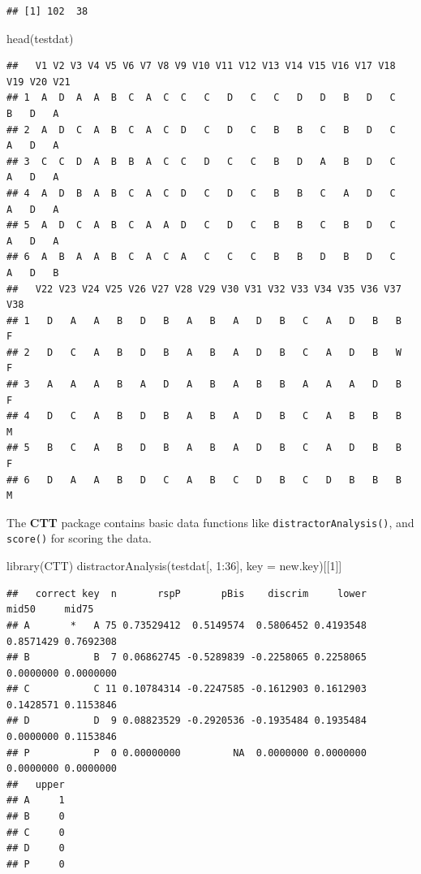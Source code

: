\documentclass[
]{book}
\newenvironment{Shaded}{\begin{snugshade}}{\end{snugshade}}
\newcommand{\AttributeTok}[1]{\textcolor[rgb]{0.77,0.63,0.00}{#1}}
\newcommand{\DecValTok}[1]{\textcolor[rgb]{0.00,0.00,0.81}{#1}}
\newcommand{\FunctionTok}[1]{\textcolor[rgb]{0.00,0.00,0.00}{#1}}
\newcommand{\NormalTok}[1]{#1}
\newcommand{\SpecialCharTok}[1]{\textcolor[rgb]{0.00,0.00,0.00}{#1}}
\begin{document}
\begin{verbatim}
## [1] 102  38
\end{verbatim}

\begin{Shaded}
\begin{Highlighting}[]
\FunctionTok{head}\NormalTok{(testdat)}
\end{Highlighting}
\end{Shaded}

\begin{verbatim}
##   V1 V2 V3 V4 V5 V6 V7 V8 V9 V10 V11 V12 V13 V14 V15 V16 V17 V18 V19 V20 V21
## 1  A  D  A  A  B  C  A  C  C   C   D   C   C   D   D   B   D   C   B   D   A
## 2  A  D  C  A  B  C  A  C  D   C   D   C   B   B   C   B   D   C   A   D   A
## 3  C  C  D  A  B  B  A  C  C   D   C   C   B   D   A   B   D   C   A   D   A
## 4  A  D  B  A  B  C  A  C  D   C   D   C   B   B   C   A   D   C   A   D   A
## 5  A  D  C  A  B  C  A  A  D   C   D   C   B   B   C   B   D   C   A   D   A
## 6  A  B  A  A  B  C  A  C  A   C   C   C   B   B   D   B   D   C   A   D   B
##   V22 V23 V24 V25 V26 V27 V28 V29 V30 V31 V32 V33 V34 V35 V36 V37 V38
## 1   D   A   A   B   D   B   A   B   A   D   B   C   A   D   B   B   F
## 2   D   C   A   B   D   B   A   B   A   D   B   C   A   D   B   W   F
## 3   A   A   A   B   A   D   A   B   A   B   B   A   A   A   D   B   F
## 4   D   C   A   B   D   B   A   B   A   D   B   C   A   B   B   B   M
## 5   B   C   A   B   D   B   A   B   A   D   B   C   A   D   B   B   F
## 6   D   A   A   B   D   C   A   B   C   D   B   C   D   B   B   B   M
\end{verbatim}

The \textbf{CTT} package contains basic data functions like \texttt{distractorAnalysis()}, and \texttt{score()} for scoring the data.

\begin{Shaded}
\begin{Highlighting}[]
\FunctionTok{library}\NormalTok{(CTT)}
\FunctionTok{distractorAnalysis}\NormalTok{(testdat[, }\DecValTok{1}\SpecialCharTok{:}\DecValTok{36}\NormalTok{], }\AttributeTok{key =}\NormalTok{ new.key)[[}\DecValTok{1}\NormalTok{]]}
\end{Highlighting}
\end{Shaded}

\begin{verbatim}
##   correct key  n       rspP       pBis    discrim     lower     mid50     mid75
## A       *   A 75 0.73529412  0.5149574  0.5806452 0.4193548 0.8571429 0.7692308
## B           B  7 0.06862745 -0.5289839 -0.2258065 0.2258065 0.0000000 0.0000000
## C           C 11 0.10784314 -0.2247585 -0.1612903 0.1612903 0.1428571 0.1153846
## D           D  9 0.08823529 -0.2920536 -0.1935484 0.1935484 0.0000000 0.1153846
## P           P  0 0.00000000         NA  0.0000000 0.0000000 0.0000000 0.0000000
##   upper
## A     1
## B     0
## C     0
## D     0
## P     0
\end{verbatim}
\end{document}
